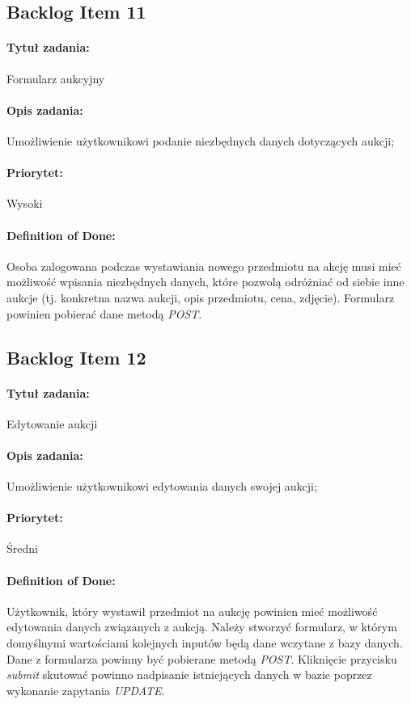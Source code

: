 \documentclass[a4paper]{article}
\begin{document}
	\subsection{Backlog Item 11}
	\paragraph{Tytuł zadania:} Formularz aukcyjny
	\paragraph{Opis zadania:} Umożliwienie użytkownikowi podanie niezbędnych danych dotyczących aukcji;
	\paragraph{Priorytet:} Wysoki
	\paragraph{Definition of Done:} Osoba zalogowana podczas wystawiania nowego przedmiotu na akcję musi mieć możliwość wpisania niezbędnych danych, które pozwolą odróżniać od siebie inne aukcje (tj. konkretna nazwa aukcji, opis przedmiotu, cena, zdjęcie). Formularz powinien pobierać dane metodą \emph{POST}.
	
	\subsection{Backlog Item 12}
	\paragraph{Tytuł zadania:} Edytowanie aukcji
	\paragraph{Opis zadania:} Umożliwienie użytkownikowi edytowania danych swojej aukcji;
	\paragraph{Priorytet:} Średni
	\paragraph{Definition of Done:} Użytkownik, który wystawił przedmiot na aukcję powinien mieć możliwość edytowania danych związanych z aukcją. Należy stworzyć formularz, w którym domyślnymi wartościami kolejnych inputów będą dane wczytane z bazy danych. Dane z formularza powinny być pobierane metodą \emph{POST}. Kliknięcie przycisku \emph{submit} skutować powinno nadpisanie istniejących danych w bazie poprzez wykonanie zapytania \emph{UPDATE}.
	
\end{document}
